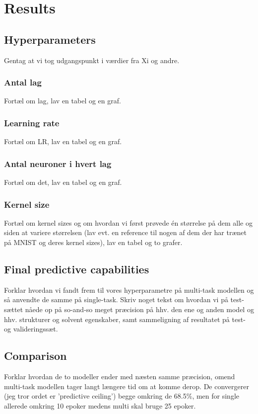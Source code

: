 \section{Results}

\subsection{Hyperparameters}
Gentag at vi tog udgangspunkt i værdier fra Xi og andre.
\subsubsection{Antal lag}
Fortæl om lag, lav en tabel og en graf.

\subsubsection{Learning rate}
Fortæl om LR, lav en tabel og en graf.

\subsubsection{Antal neuroner i hvert lag}
Fortæl om det, lav en tabel og en graf.

\subsubsection{Kernel size}
Fortæl om kernel sizes og om hvordan vi først prøvede én størrelse på dem alle og siden at variere størrelsen (lav evt. en reference til nogen af dem der har trænet på MNIST og deres kernel sizes), lav en tabel og to grafer.


\subsection{Final predictive capabilities}
Forklar hvordan vi fandt frem til vores hyperparametre på multi-task modellen og så anvendte de samme på single-task. Skriv noget tekst om hvordan vi på test-sættet nåede op på so-and-so meget præcision på hhv. den ene og anden model og hhv. strukturer og solvent egenskaber, samt sammeligning af resultatet på test- og valideringssæt.


\subsection{Comparison}
Forklar hvordan de to modeller ender med næsten samme præcision, omend multi-task modellen tager langt længere tid om at komme derop. De convergerer (jeg tror ordet er 'predictive ceiling') begge omkring de 68.5\%, men for single allerede omkring 10 epoker medens multi skal bruge 25 epoker.
